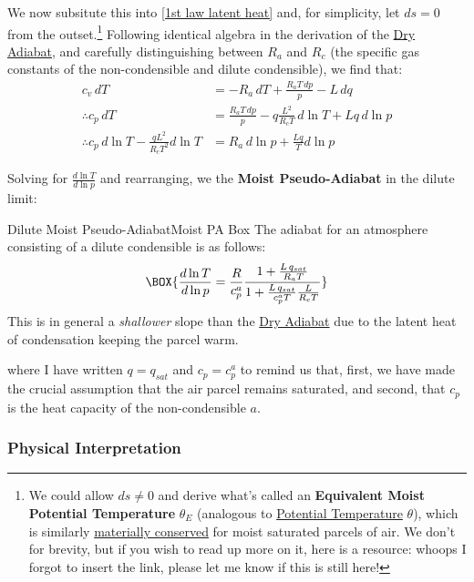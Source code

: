 \noindent We now subsitute this into \ref{1st law latent heat} and, for simplicity, let $ds=0$ from the outset.\footnote{We could allow $ds\neq 0$ and derive what's called an \textbf{Equivalent Moist Potential Temperature} $\theta_E$ (analogous to \hyperref[Potential Temperature]{Potential Temperature} $\theta$), which is similarly \hyperref[Material Conservation]{materially conserved} for moist saturated parcels of air. We don't for brevity, but if you wish to read up more on it, here is a resource: whoops I forgot to insert the link, please let me know if this is still here!} Following identical algebra in the derivation of the \hyperref[Dry Adiabat]{Dry Adiabat}, and carefully distinguishing between $R_a$ and $R_c$ (the specific gas constants of the non-condensible and dilute condensible), we find that:
\begin{align*}
    c_v\,dT & =-R_a\,dT+\frac{R_aT\,dp}{p}-L\,dq\\
    \therefore c_p\,dT &= \frac{R_a T\,dp}{p} - q\frac{L^2}{R_cT}\,d\ln T+Lq\,d\ln p\\
    \therefore c_p\,d\ln T - \frac{q L^2}{R_c T^2}d\ln T&=R_a\,d\ln p + \frac{Lq}{T}d\ln p
\end{align*}

\noindent Solving for $\frac{d\ln T}{d\ln p}$ and rearranging, we the \textbf{Moist Pseudo-Adiabat} in the dilute limit:
\begin{fact}{Dilute Moist Pseudo-Adiabat}{Moist PA Box}\label{Moist PA Box}
    The adiabat for an atmosphere consisting of a dilute condensible is as follows:
    \begin{align}\label{dilute moist adiabat}
        \BOX{\frac{d\ln T}{d\ln p}=\frac{R}{c_p^a}\frac{1+\frac{L\,q_{sat}}{R_aT}}{1+\frac{L\,q_{sat}}{c_p^aT}\frac{L}{R_cT}}}
    \end{align}
    This is in general a \textit{shallower} slope than the \hyperref[Dry Adiabat Box]{Dry Adiabat} due to the latent heat of condensation keeping the parcel warm.
\end{fact}

\noindent where I have written $q=q_{sat}$ and $c_p=c_p^a$ to remind us that, first, we have made the crucial assumption that the air parcel remains saturated, and second, that $c_p$ is the heat capacity of the non-condensible $a$.

\subsubsection{Physical Interpretation}

